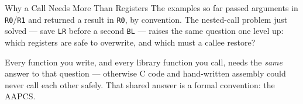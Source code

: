 \documentclass[9pt,aspectratio=169,xcolor=table]{beamer}
\begin{document}
%
%
%
%
%
%
%
%
%


\begin{frame}{Why a Call Needs More Than Registers}
    \leavevmode
    {\small The examples so far passed arguments in \texttt{R0}/\texttt{R1} and
    returned a result in \texttt{R0}, by convention. The nested-call problem
    just solved --- save \texttt{LR} before a second \texttt{BL} --- raises the
    same question one level up: \alert{which} registers are safe to overwrite,
    and which must a callee restore?}

    \vspace{2mm}
    {\small Every function you write, and every library function you call,
    needs the \emph{same} answer to that question --- otherwise C code and
    hand-written assembly could never call each other safely. That shared
    answer is a formal convention: the \alert{AAPCS}.}
\end{frame}
\end{document}
